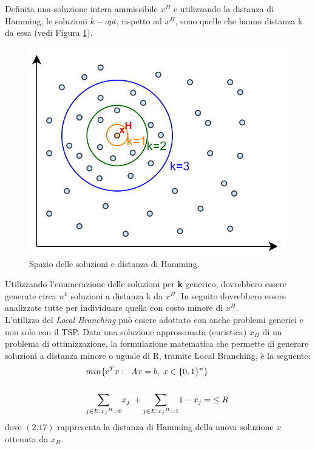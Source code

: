 Definita una soluzione intera ammissibile $x^H$ e utilizzando la distanza di Hamming, le soluzioni $k-opt$, rispetto ad $x^H$, sono quelle che hanno distanza k da essa (vedi Figura \ref{opt}).\\
\begin{figure}[H] 
\begin{center} 
  \includegraphics[scale=0.3]{Images/opt}
  \caption{\footnotesize{Spazio delle soluzioni e distanza di Hamming.}} \label{opt} 
\end{center} 
\end{figure}
Utilizzando l'enumerazione delle soluzioni per \textbf{k} generico, dovrebbero essere generate circa $n^k$ soluzioni a distanza k da $x^H$. In seguito dovrebbero essere analizzate tutte per individuare quella con costo minore di $x^H$.\\
L'utilizzo del \textit{Local Branching} può essere adottato con anche problemi generici e non solo con il TSP. Data una soluzione approssimata (euristica) $x_H$ di un problema di ottimizzazione, la formulazione matematica che permette di generare soluzioni a distanza minore o uguale di R, tramite Local Branching, è la seguente:
\begin{align}
& min \{ c^T x:\;\;Ax=b,\;x\in\{0,1\}^n\} \\ \notag \\
& \underset{j\in E:{x_j}^H=0}\sum{x_j}\;+ \underset{j\in E:{x_j}^H=1}\sum{1-x_j}=\; \leq R
\end{align}
dove $(2.17)$ rappresenta la distanza di Hamming della nuova soluzione $x$ ottenuta da $x_H$.\\
